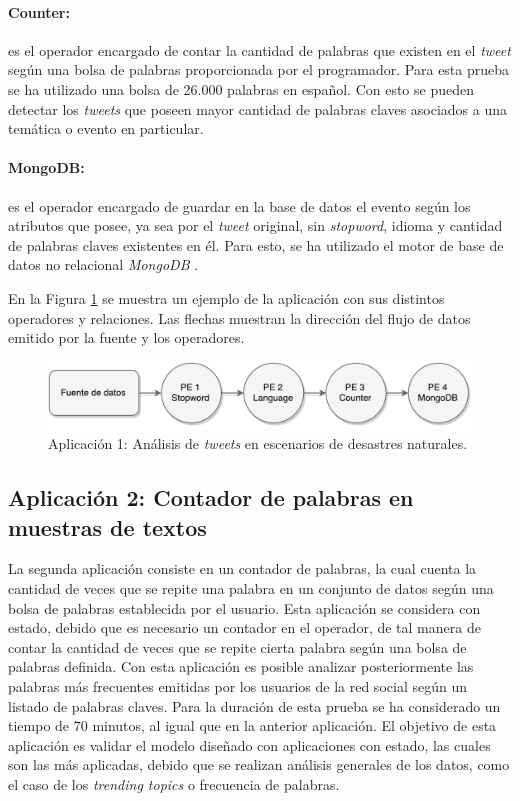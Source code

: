 \paragraph{Counter:} es el operador encargado de contar la cantidad de palabras que existen en el \textit{tweet} según una bolsa de palabras proporcionada por el programador. Para esta prueba se ha utilizado una bolsa de 26.000 palabras en español. Con esto se pueden detectar los \textit{tweets} que poseen mayor cantidad de palabras claves asociados a una temática o evento en particular.

\paragraph{MongoDB:} es el operador encargado de guardar en la base de datos el evento según los atributos que posee, ya sea por el \textit{tweet} original, sin \textit{stopword}, idioma y cantidad de palabras claves existentes en él. Para esto, se ha utilizado el motor de base de datos no relacional \textit{MongoDB} \citep{chodorow2013mongodb}.

En la Figura \ref{fig:primeraAplicacion} se muestra un ejemplo de la aplicación con sus distintos operadores y relaciones. Las flechas muestran la dirección del flujo de datos emitido por la fuente y los operadores.

\begin{figure}[!hb]
	\centering
		\includegraphics[scale=0.6]{images/App1.pdf}
	\caption{Aplicación 1: Análisis de \textit{tweets} en escenarios de desastres naturales.}
	\label{fig:primeraAplicacion}
\end{figure}

\subsection{Aplicación 2: Contador de palabras en muestras de textos}
La segunda aplicación consiste en un contador de palabras, la cual cuenta la cantidad de veces que se repite una palabra en un conjunto de datos según una bolsa de palabras establecida por el usuario. Esta aplicación se considera con estado, debido que es necesario un contador en el operador, de tal manera de contar la cantidad de veces que se repite cierta palabra según una bolsa de palabras definida. Con esta aplicación es posible analizar posteriormente las palabras más frecuentes emitidas por los usuarios de la red social según un listado de palabras claves. Para la duración de esta prueba se ha considerado un tiempo de 70 minutos, al igual que en la anterior aplicación. El objetivo de esta aplicación es validar el modelo diseñado con aplicaciones con estado, las cuales son las más aplicadas, debido que se realizan análisis generales de los datos, como el caso de los \textit{trending topics} o frecuencia de palabras.

